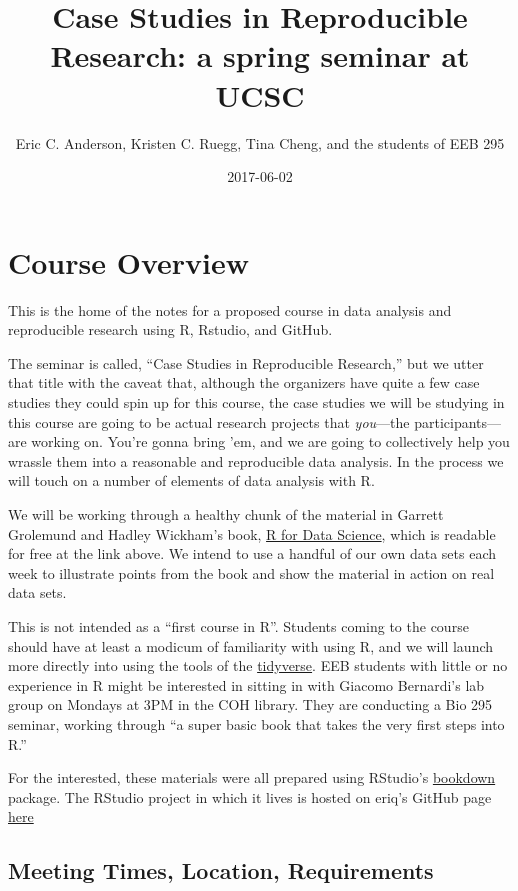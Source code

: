 \documentclass[]{book}
\title{Case Studies in Reproducible Research: a spring seminar at UCSC}
\author{Eric C. Anderson, Kristen C. Ruegg, Tina Cheng, and the students of EEB
295}
\date{2017-06-02}
\theoremstyle{definition}
\theoremstyle{definition}
\theoremstyle{remark}
\begin{document}
\maketitle

{
\setcounter{tocdepth}{1}
\tableofcontents
}
\chapter{Course Overview}\label{course-overview}

This is the home of the notes for a proposed course in data analysis and
reproducible research using R, Rstudio, and GitHub.

The seminar is called, ``Case Studies in Reproducible Research,'' but we
utter that title with the caveat that, although the organizers have
quite a few case studies they could spin up for this course, the case
studies we will be studying in this course are going to be actual
research projects that \emph{you}---the participants---are working on.
You're gonna bring 'em, and we are going to collectively help you
wrassle them into a reasonable and reproducible data analysis. In the
process we will touch on a number of elements of data analysis with R.

We will be working through a healthy chunk of the material in Garrett
Grolemund and Hadley Wickham's book, \href{http://r4ds.had.co.nz/}{R for
Data Science}, which is readable for free at the link above. We intend
to use a handful of our own data sets each week to illustrate points
from the book and show the material in action on real data sets.

This is not intended as a ``first course in R''. Students coming to the
course should have at least a modicum of familiarity with using R, and
we will launch more directly into using the tools of the
\href{http://tidyverse.org/}{tidyverse}. EEB students with little or no
experience in R might be interested in sitting in with Giacomo
Bernardi's lab group on Mondays at 3PM in the COH library. They are
conducting a Bio 295 seminar, working through ``a super basic book that
takes the very first steps into R.''

For the interested, these materials were all prepared using RStudio's
\href{https://bookdown.org/}{bookdown} package. The RStudio project in
which it lives is hosted on eriq's GitHub page
\href{https://github.com/eriqande/rep-res-eeb-2017}{here}

\section{Meeting Times, Location,
Requirements}\label{meeting-times-location-requirements}
\end{document}
